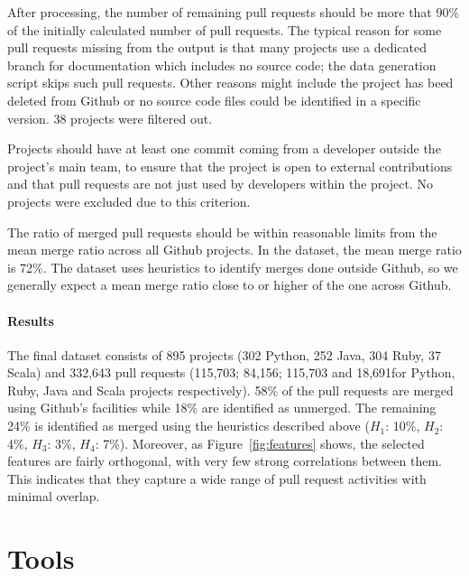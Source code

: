 \documentclass{sig-alternate}
\begin{document}
\begin{compactitem}

  \item After processing, the number of remaining pull requests should be more
    that 90\% of the initially calculated number of pull requests.
    The typical reason for some pull requests missing from the output
    is that many projects use a dedicated branch for documentation which
    includes no source code; the data generation script skips such pull
    requests. Other reasons might include the project has beed deleted from
    Github or no source code files could be identified in a specific version. 
    38 projects were filtered out.

  \item Projects should have at least one commit coming from a developer outside
    the project's main team, to ensure that the project is open to external
    contributions and that pull requests are not just used by developers within
    the project. No projects were excluded due to this criterion. 

  \item The ratio of merged pull requests should be within reasonable limits
    from the mean merge ratio across all Github projects. In the \ghtorrent
    dataset, the mean merge ratio is 72\%. The \pullreqs dataset uses heuristics
    to identify merges done outside Github, so we generally expect a mean merge
    ratio close to or higher of the one across Github.

\end{compactitem}

\paragraph*{Results} The final dataset consists of 895 projects (302 Python, 252 Java, 304 Ruby, 37
Scala) and 332,643 pull requests (115,703; 84,156; 115,703 and 18,691for Python,
Ruby, Java and Scala projects respectively). 58\% of the pull requests are
merged using Github's facilities while 18\% are identified as unmerged.
The remaining 24\% is identified as merged using the heuristics described
above ($H_1$: 10\%, $H_2$: 4\%, $H_3$: 3\%, $H_4$: 7\%).
Moreover, as Figure~\ref{fig:features} shows,
the selected features are fairly orthogonal, with very few strong correlations
between them. This indicates that they capture a wide range of pull
request activities with minimal overlap.

\section{Tools}
\end{document}

